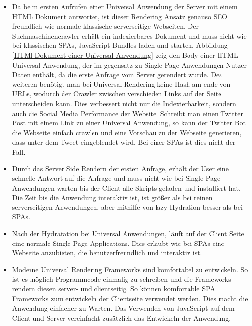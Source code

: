 \documentclass[runningheads]{llncs}
\begin{document}
\begin{itemize}
  \setlength\itemsep{1em}
  \item Da beim ersten Aufrufen einer Universal Anwendung der Server mit einem HTML Dokument antwortet, 
  ist dieser Rendering Ansatz genauso SEO freundlich wie normale klassische serverseitige Webseiten. 
  Der Suchmaschinencrawler erhält ein indexierbares Dokument und muss nicht wie bei klassischen SPAs, 
  JavaScript Bundles laden und starten. 
  Abbildung \ref{HTMl Dokument einer Universal Anwendung}
  zeig den Body einer HTML Universal Anwendung, der im gegensatz zu Single Page Anwendungen Nutzer Daten
  enthält, da die erste Anfrage vom Server gerendert wurde.
  Des weiteren benötigt man bei Universal Rendering keine Hash am ende von URLs, 
  wodurch der Crawler zwischen verschieden Links auf der Seite unterscheiden kann. 
  Dies verbessert nicht nur die Indexierbarkeit, 
  sondern auch die Social Media Performance der Website. 
  Schreibt man einen Twitter Post mit einem Link zu einer Universal Anwendung, 
  so kann der Twitter Bot die Webseite einfach crawlen und eine Vorschau zu der Webseite generieren, 
  dass unter dem Tweet eingeblendet wird. 
  Bei einer SPAs ist dies nicht der Fall.
  \item Durch das Server Side Rendern der ersten Anfrage, 
  erhält der User eine schnelle Antwort auf die Anfrage und 
  muss nicht wie bei Single Page Anwendungen warten bis der Client alle Skripts geladen und 
  installiert hat. Die Zeit bis die Anwendung interaktiv ist, 
  ist größer als bei reinen serverseitigen Anwendungen, 
  aber mithilfe von lazy Hydration besser als bei SPAs. 
  \item Nach der Hydratation bei Universal Anwendungen, 
  läuft auf der Client Seite eine normale Single Page Applications. 
  Dies erlaubt wie bei SPAs eine Webseite anzubieten, 
  die benutzerfreundlich und interaktiv ist.
  \item Moderne Universal Rendering Frameworks sind komfortabel zu entwickeln. 
  So ist es möglich Programmcode einmalig zu schreiben und 
  die Frameworks rendern diesen server- und clientseitig. 
  So können komfortable SPA Frameworks zum entwickeln der Clientseite verwendet werden. 
  Dies macht die Anwendung einfacher zu Warten. 
  Das Verwenden von JavaScript auf dem Client und 
  Server vereinfacht zusätzlich das Entwickeln der Anwendung.
\end{itemize}
\end{document}
